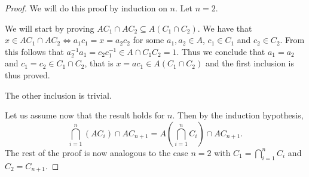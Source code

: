 \begin{proof}
    We will do this proof by induction on $n$.
    Let $n = 2$. 
    
    We will start by proving $AC_1 \cap AC_2 \subseteq A(C_1 \cap C_2)$.
    We have that $x \in AC_1 \cap AC_2 \iff a_1c_1 = x = a_2c_2$ for some $a_1, a_2 \in A$, $c_1 \in C_1$ and $c_2 \in C_2$. From this follows that $a_2^{-1}a_1 = c_2c_1^{-1} \in A \cap C_1C_2 = 1$. Thus we conclude that $a_1 = a_2$ and $c_1 = c_2 \in C_1 \cap C_2$, that is $x = ac_1 \in A(C_1 \cap C_2)$ and the first inclusion is thus proved. 

    The other inclusion is trivial.

    Let us assume now that the result holds for $n$. 
    Then by the induction hypothesis,
    $$
    \bigcap_{i = 1}^{n}(AC_i) \cap AC_{n+1} = A(\bigcap_{i = 1}^{n}C_i) \cap AC_{n+1}.
    $$
    The rest of the proof is now analogous to the case $n = 2$ with $C_1 = \bigcap_{i = 1}^{n}C_i$ and $C_2 = C_{n+1}$.
\end{proof}